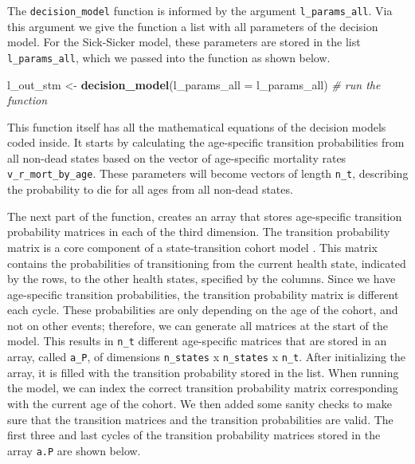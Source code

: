 \documentclass[
]{book}
\newenvironment{Shaded}{\begin{snugshade}}{\end{snugshade}}
\newcommand{\AttributeTok}[1]{\textcolor[rgb]{0.13,0.29,0.53}{#1}}
\newcommand{\CommentTok}[1]{\textcolor[rgb]{0.56,0.35,0.01}{\textit{#1}}}
\newcommand{\FunctionTok}[1]{\textcolor[rgb]{0.13,0.29,0.53}{\textbf{#1}}}
\newcommand{\NormalTok}[1]{#1}
\newcommand{\OtherTok}[1]{\textcolor[rgb]{0.56,0.35,0.01}{#1}}
\begin{document}
The \texttt{decision\_model} function is informed by the argument \texttt{l\_params\_all}. Via this argument we give the function a list with all parameters of the decision model. For the Sick-Sicker model, these parameters are stored in the list \texttt{l\_params\_all}, which we passed into the function as shown below.

\begin{Shaded}
\begin{Highlighting}[]
\NormalTok{l\_out\_stm }\OtherTok{\textless{}{-}} \FunctionTok{decision\_model}\NormalTok{(}\AttributeTok{l\_params\_all =}\NormalTok{ l\_params\_all) }\CommentTok{\# run the function}
\end{Highlighting}
\end{Shaded}

This function itself has all the mathematical equations of the decision models coded inside. It starts by calculating the age-specific transition probabilities from all non-dead states based on the vector of age-specific mortality rates \texttt{v\_r\_mort\_by\_age}. These parameters will become vectors of length \texttt{n\_t}, describing the probability to die for all ages from all non-dead states.

The next part of the function, creates an array that stores age-specific transition probability matrices in each of the third dimension. The transition probability matrix is a core component of a state-transition cohort model \citep{Iskandar2018}. This matrix contains the probabilities of transitioning from the current health state, indicated by the rows, to the other health states, specified by the columns. Since we have age-specific transition probabilities, the transition probability matrix is different each cycle. These probabilities are only depending on the age of the cohort, and not on other events; therefore, we can generate all matrices at the start of the model. This results in \texttt{n\_t} different age-specific matrices that are stored in an array, called \texttt{a\_P}, of dimensions \texttt{n\_states} x \texttt{n\_states} x \texttt{n\_t}. After initializing the array, it is filled with the transition probability stored in the list. When running the model, we can index the correct transition probability matrix corresponding with the current age of the cohort. We then added some sanity checks to make sure that the transition matrices and the transition probabilities are valid. The first three and last cycles of the transition probability matrices stored in the array \texttt{a.P} are shown below.
\end{document}
